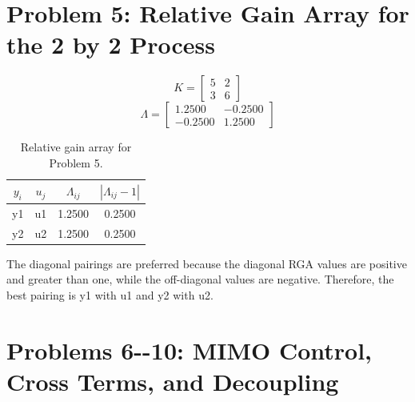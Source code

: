 \documentclass{article}%
\begin{document}
%
\section*{Problem 5: Relative Gain Array for the 2 by 2 Process}%
\label{sec:Problem5RelativeGainArrayforthe2by2Process}%
\[%
K = \begin{bmatrix} 5 & 2 \\ 3 & 6 \end{bmatrix}%
\]%
\[%
\Lambda = \begin{bmatrix} 1.2500 & -0.2500 \\ -0.2500 & 1.2500 \end{bmatrix}%
\]%
\begin{table}[H]%
\centering%
\begin{tabular}{cccc}%
\hline%
$y_i$&$u_j$&$\Lambda_{ij}$&$|\Lambda_{ij}-1|$\\%
\hline%
y1&u1&1.2500&0.2500\\%
\hline%
y2&u2&1.2500&0.2500\\%
\hline%
\end{tabular}%
\caption{Relative gain array for Problem 5.}%
\label{tab:problem5_rga}%
\end{table}%
The diagonal pairings are preferred because the diagonal RGA values are positive and greater than one, while the off{-}diagonal values are negative. Therefore, the best pairing is y1 with u1 and y2 with u2.%
\par

%
\section*{Problems 6{-}{-}10: MIMO Control, Cross Terms, and Decoupling}%
\label{sec:Problems6{-}{-}10MIMOControl,CrossTerms,andDecoupling}%
\end{document}
